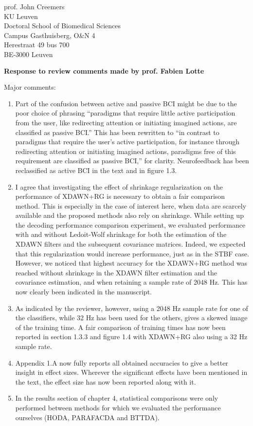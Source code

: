 \documentclass{letter}
\newcommand{\reply}[1]{%
	\textbf{Response to review comments made by prof. #1}

}
\begin{document}
\begin{letter}{%
	prof. John Creemers \\
	KU Leuven \\
	Doctoral School of Biomedical Sciences \\
	Campus Gasthuisberg, O\&N 4 \\
	Herestraat 49 bus 700 \\
	BE-3000 Leuven

}
\reply{Fabien Lotte}
Major comments:
\begin{enumerate}
	\item
    Part of the confusion between active and passive BCI might be due
	  to the poor choice of phrasing ``paradigms that require little active
    participation from the user, like redirecting attention or initiating
    imagined actions, are classified as passive BCI.''
	  This has been rewritten to ``in contrast to paradigms that require the
    user's active participation, for
	  instance through redirecting attention or initiating imagined actions,
	  paradigms free of this requirement are classified as passive BCI,''
	  for clarity.
	  Neurofeedback has been reclassified as active BCI in the text and in
	  figure 1.3.
	\item I agree that investigating the effect of shrinkage regularization on the
    performance of XDAWN+RG is necessary to obtain a fair comparison method.
    This is especially in the case of interest here, when data are scarcely
    available and the proposed methods also rely on shrinkage.
    While setting up the decoding performance comparison experiment, we
    evaluated performance with and without Ledoit-Wolf shrinkage for both the
    estimation of the XDAWN filters and the subsequent covariance matrices.
    Indeed, we expected that this regularization would increase performance,
    just as in the STBF case. However, we noticed that highest accuracy for the
    XDAWN+RG method was reached without shrinkage in the XDAWN filter
    estimation and the covariance estimation, and when retaining a sample rate
    of 2048 Hz.
    This has now clearly been indicated in the manuscript.
  \item
    As indicated by the reviewer, however, using a 2048 Hz sample rate for one of the
    classifiers, while 32 Hz has been used for the others, gives a skewed image
    of the training time.
    A fair comparison of training times has now been reported in section 1.3.3
    and figure 1.4 with XDAWN+RG also using a 32 Hz sample rate.
  \item Appendix 1.A now fully reports all obtained accuracies to give a better
    insight in effect sizes. Wherever the significant effects have been mentioned
    in the text, the effect size has now been reported along with it.
	\item
    In the results section of chapter 4, statistical comparisons were
	  only performed between methods for which we evaluated the performance
	  ourselves (HODA, PARAFACDA and BTTDA).

\end{enumerate}
\end{letter}
\end{document}
